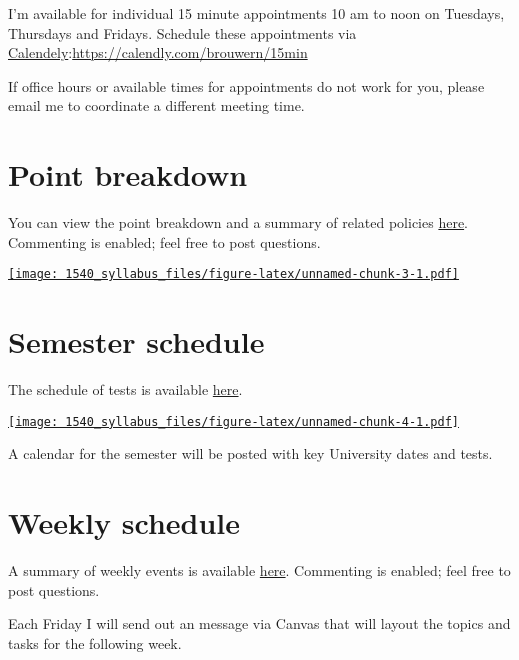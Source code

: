 \documentclass[
]{book}
\begin{document}
I'm available for individual 15 minute appointments 10 am to noon on Tuesdays, Thursdays and Fridays. Schedule these appointments via \href{https://calendly.com/brouwern/15min}{Calendely}:\url{https://calendly.com/brouwern/15min}

If office hours or available times for appointments do not work for you, please email me to coordinate a different meeting time.

\hypertarget{points}{%
\chapter{Point breakdown}\label{points}}

You can view the point breakdown and a summary of related policies \href{https://docs.google.com/spreadsheets/d/1G_-Iqg85j5HgYVSwHyutMkaZWkZzbr32we-HVjJZhdk/edit?usp=sharing}{here}. Commenting is enabled; feel free to post questions.

\href{https://docs.google.com/spreadsheets/d/1G_-Iqg85j5HgYVSwHyutMkaZWkZzbr32we-HVjJZhdk/edit?usp=sharing}{\texttt{[image: 1540\_syllabus\_files/figure-latex/unnamed-chunk-3-1.pdf]}}

\hypertarget{semester-schedule}{%
\chapter{Semester schedule}\label{semester-schedule}}

The schedule of tests is available \href{https://docs.google.com/spreadsheets/d/1Zsqfqako3ctJByqRzbU2bTcv7fCXCKLHp_RDfzd-Qmg/edit?usp=sharing}{here}.

\href{https://docs.google.com/spreadsheets/d/1Zsqfqako3ctJByqRzbU2bTcv7fCXCKLHp_RDfzd-Qmg/edit?usp=sharing}{\texttt{[image: 1540\_syllabus\_files/figure-latex/unnamed-chunk-4-1.pdf]}}

A calendar for the semester will be posted with key University dates and tests.

\hypertarget{weekly-schedule}{%
\chapter{Weekly schedule}\label{weekly-schedule}}

A summary of weekly events is available \href{https://docs.google.com/spreadsheets/d/12ryH_WBJadioURhMu9HHSO1NxyBA6f9QAuTdasXkY3Y/edit?usp=sharing}{here}. Commenting is enabled; feel free to post questions.

Each Friday I will send out an message via Canvas that will layout the topics and tasks for the following week.
\end{document}
